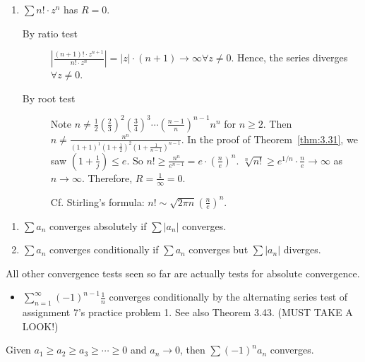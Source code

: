 \begin{example}
	\begin{enumerate}
		\item $\sum{n! \cdot z^{n}}$ has $R=0$.
		      \begin{description}
			      \item [By ratio test]
			            $\left| \frac{(n+1)! \cdot z^{n+1}}{n! \cdot z^{n}} \right|=|z|\cdot(n+1) \to \infty \forall z\neq 0$. Hence, the series diverges $\forall z \neq 0$.
			      \item[By root test]
			            Note $n\neq \frac{1}{2}(\frac{2}{3})^{2}(\frac{3}{4})^{3} \cdots (\frac{n-1}{n})^{n-1} n^{n}$ for $n\ge 2$.
			            Then $n\neq  \frac{n^{n}}{(1+1)^{1}(1+\frac{1}{2})^{2}(1+\frac{1}{n-1})^{n-1}}$. In the proof of Theorem~\ref{thm:3.31}, we saw $(1+\frac{1}{j})\le e$. So $n! \ge \frac{n^{n}}{e^{n-1}}=e \cdot (\frac{n}{e})^{n}$.
			            $\sqrt[n]{n!}\ge e^{1/n} \cdot \frac{n}{e} \to \infty$ as $n\to \infty$. Therefore, $R=\frac{1}{\infty}=0$.
			            \begin{note}
				            Cf. Stirling's formula: $n! \sim \sqrt{2\pi n} \left( \frac{n}{e} \right)^{n}$.
			            \end{note}
		      \end{description}
	\end{enumerate}
\end{example}
\begin{definition}
	\hfill
	\begin{enumerate}
		\item
		      $\sum{a_{n}}$ converges absolutely if $\sum{|a_{n}|}$ converges.
		\item $\sum{a_{n}}$ converges conditionally if $\sum{a_{n}}$ converges but $\sum{|a_{n}|}$ diverges.
	\end{enumerate}
	\hfill
	\begin{remark}
		All other convergence tests seen so far are actually tests for absolute convergence.
	\end{remark}
\end{definition}

\begin{example}
	\begin{itemize}
		\item
		      $\sum_{n=1}^{\infty}{(-1)^{n-1}\frac{1}{n}}$ converges conditionally by the alternating series test of assignment 7's practice problem 1. See also Theorem 3.43. (MUST TAKE A LOOK!)
	\end{itemize}
	\item Given $a_1\ge a_2\ge a_3\ge \cdots \ge 0$ and $a_{n}\to 0$, then $\sum{(-1)^{n}a_{n}}$ converges.
\end{example}


